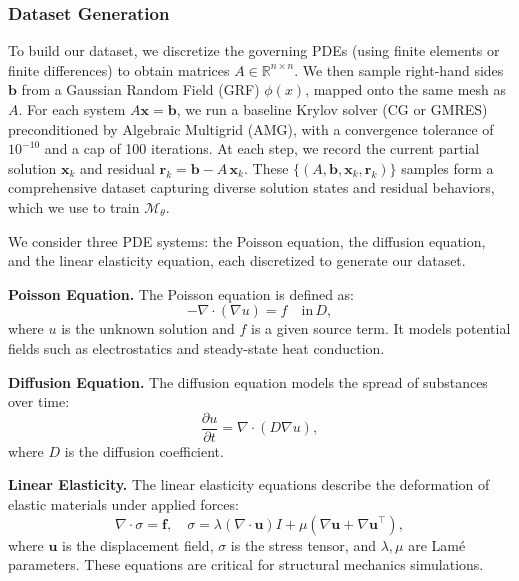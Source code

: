 \subsubsection{Dataset Generation}
To build our dataset, we discretize the governing PDEs (using finite elements or finite differences) to obtain matrices \(A \in \mathbb{R}^{n\times n}\). We then sample right-hand sides \(\mathbf{b}\) from a Gaussian Random Field (GRF) \(\phi(x)\), mapped onto the same mesh as \(A\). For each system \(A\mathbf{x} = \mathbf{b}\), we run a baseline Krylov solver (CG or GMRES) preconditioned by Algebraic Multigrid (AMG), with a convergence tolerance of \(10^{-10}\) and a cap of 100 iterations. At each step, we record the current partial solution \(\mathbf{x}_{k}\) and residual \(\mathbf{r}_{k} = \mathbf{b} - A\,\mathbf{x}_{k}\). These \(\{(A, \mathbf{b}, \mathbf{x}_{k}, \mathbf{r}_{k})\}\) samples form a comprehensive dataset capturing diverse solution states and residual behaviors, which we use to train \(\mathcal{M}_{\theta}\).

We consider three PDE systems: the Poisson equation, the diffusion equation, and the linear elasticity equation, each discretized to generate our dataset.

\textbf{Poisson Equation.} The Poisson equation is defined as:
\begin{equation}
    -\nabla \cdot (\nabla u) = f \quad \text{in} \, D,
\end{equation}
where \(u\) is the unknown solution and \(f\) is a given source term. It models potential fields such as electrostatics and steady-state heat conduction.

\textbf{Diffusion Equation.} The diffusion equation models the spread of substances over time:
\begin{equation}
    \frac{\partial u}{\partial t} = \nabla \cdot (D \nabla u),
\end{equation}
where \(D\) is the diffusion coefficient. 

\textbf{Linear Elasticity.} The linear elasticity equations describe the deformation of elastic materials under applied forces:
\begin{equation}
    \nabla \cdot \sigma = \mathbf{f}, \quad \sigma = \lambda (\nabla \cdot \mathbf{u}) I + \mu (\nabla \mathbf{u} + \nabla \mathbf{u}^\top),
\end{equation}
where \(\mathbf{u}\) is the displacement field, \(\sigma\) is the stress tensor, and \(\lambda, \mu\) are Lamé parameters. These equations are critical for structural mechanics simulations.

